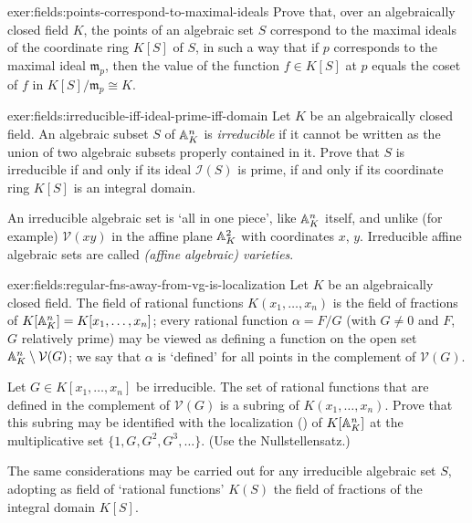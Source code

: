 \begin{exer}{}{exer:fields:points-correspond-to-maximal-ideals}
  Prove that, over an algebraically closed field $K$, the points of an
  algebraic set $S$ correspond to the maximal ideals of the coordinate
  ring $K[S]$ of $S$, in such a way that if $p$ corresponds to the
  maximal ideal $\mathfrak{m}_p$, then the value of the function
  $f \in K[S]$ at $p$ equals the coset of $f$ in
  $K[S]/\mathfrak{m}_p \cong K$.
\end{exer}
\begin{exer}{}{exer:fields:irreducible-iff-ideal-prime-iff-domain}
  Let $K$ be an algebraically closed field. An algebraic subset $S$ of
  $\mathbb{A}^n_K$ is \emph{irreducible} if it cannot be written as the union
  of two algebraic subsets properly contained in it. Prove that $S$ is
  irreducible if and only if its ideal $\mathcal{I}(S)$ is prime, if
  and only if its coordinate ring $K[S]$ is an integral domain.

  An irreducible algebraic set is `all in one piece', like $\mathbb{A}^n_K$
  itself, and unlike (for example) $\mathcal{V}(xy)$ in the affine
  plane $\mathbb{A}^2_K$ with coordinates $x$, $y$. Irreducible affine
  algebraic sets are called \emph{(affine algebraic) varieties}.
\end{exer}
\begin{exer}{}{exer:fields:regular-fns-away-from-vg-is-localization}
  Let $K$ be an algebraically closed field. The field of rational
  functions $K(x_1, \dots, x_n)$ is the field of fractions of
  $K[\mathbb{A}^n_K] = K[x_1, \dots, x_n]$; every rational function
  $\alpha = F/G$ (with $G \neq 0$ and $F$, $G$ relatively prime) may
  be viewed as defining a function on the open set
  $\mathbb{A}^n_K \mathbin{\backslash} \mathcal{V}(G)$; we say that $\alpha$ is `defined'
  for all points in the complement of $\mathcal{V}(G)$.

  Let $G \in K[x_1, \dots, x_n]$ be irreducible. The set of rational
  functions that are defined in the complement of $\mathcal{V}(G)$ is
  a subring of $K(x_1, \dots, x_n)$. Prove that this subring may be
  identified with the localization
  () of $K[\mathbb{A}^n_K]$ at the
  multiplicative set $\{1, G, G^2, G^3, \dots\}$. (Use the
  Nullstellensatz.)

  The same considerations may be carried out for any irreducible
  algebraic set $S$, adopting as field of `rational functions' $K(S)$
  the field of fractions of the integral domain $K[S]$.
\end{exer}
